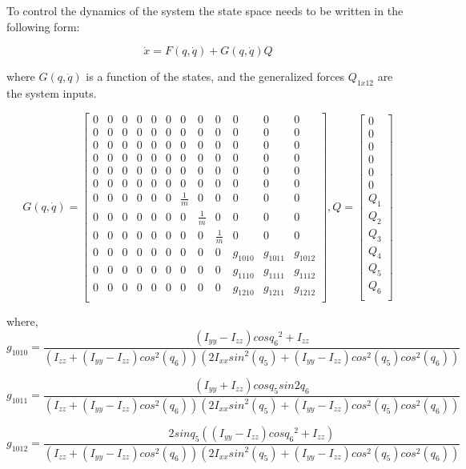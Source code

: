 \documentclass[12pt, letterpaper]{article}
\begin{document}
To control the dynamics of the system the state space needs to be written in the following form:

\[
\dot{x} = F(q,\dot{q}) + G(q,\dot{q}) Q
\]

where $G(q,\dot{q})$ is a function of the states, and the generalized forces $Q_{1x12}$ are the system inputs.

\[
G(q,\dot{q}) = \begin{bmatrix}
0&0&0&0&0&0&0&0&0&0&0&0\\
0&0&0&0&0&0&0&0&0&0&0&0\\
0&0&0&0&0&0&0&0&0&0&0&0\\
0&0&0&0&0&0&0&0&0&0&0&0\\
0&0&0&0&0&0&0&0&0&0&0&0\\
0&0&0&0&0&0&0&0&0&0&0&0\\
0&0&0&0&0&0&\frac{1}{m}&0&0&0&0&0\\
0&0&0&0&0&0&0&\frac{1}{m}&0&0&0&0\\
0&0&0&0&0&0&0&0&\frac{1}{m}&0&0&0\\
0&0&0&0&0&0&0&0&0&g_{1010}&g_{1011}&g_{1012}\\
0&0&0&0&0&0&0&0&0&g_{1110}&g_{1111}&g_{1112}\\
0&0&0&0&0&0&0&0&0&g_{1210}&g_{1211}&g_{1212}\\
\end{bmatrix},
Q = \left[\begin{array}{c}
0\\
0\\
0\\
0\\
0\\
0\\
Q_{1}\\
Q_{2}\\
Q_{3}\\
Q_{4}\\
Q_{5}\\
Q_{6}\\
\end{array}\right]
\]

where,
\[
g_{1010} = \frac{(I_{yy}-I_{zz})cos{q_{6}}^2 + I_{zz}}{(I_{zz} + (I_{yy} - I_{zz}) {cos}^{2}(q_{6})) (2 I_{xx} {sin}^{2}(q_{5}) + (I_{yy} - I_{zz}) {cos}^{2}(q_{5}) {cos}^{2}(q_{6}))}
\]

\[
g_{1011} = \frac{(I_{yy}+I_{zz})cos{q_{5}}sin{2q_{6}}}{(I_{zz} + (I_{yy} - I_{zz}) {cos}^{2}(q_{6})) (2 I_{xx} {sin}^{2}(q_{5}) + (I_{yy} - I_{zz}) {cos}^{2}(q_{5}) {cos}^{2}(q_{6}))}
\]

\[
g_{1012} = \frac{2sin{q_{5}}((I_{yy}-I_{zz})cos{q_{6}}^2 + I_{zz})}{(I_{zz} + (I_{yy} - I_{zz}) {cos}^{2}(q_{6})) (2 I_{xx} {sin}^{2}(q_{5}) + (I_{yy} - I_{zz}) {cos}^{2}(q_{5}) {cos}^{2}(q_{6}))}
\]
\end{document}
